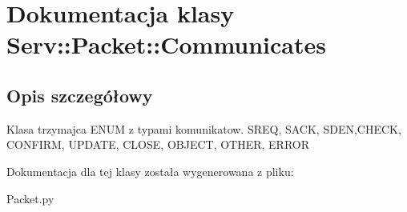 \hypertarget{class_serv_1_1_packet_1_1_communicates}{
\section{Dokumentacja klasy Serv::Packet::Communicates}
\label{class_serv_1_1_packet_1_1_communicates}
}


\subsection{Opis szczegółowy}
\begin{DoxyVerb}Klasa trzymajca ENUM z typami komunikatow.
SREQ, SACK, SDEN,CHECK, CONFIRM, UPDATE, CLOSE, OBJECT, OTHER, ERROR
\end{DoxyVerb}
 

Dokumentacja dla tej klasy została wygenerowana z pliku:\begin{DoxyCompactItemize}
\item 
Packet.py\end{DoxyCompactItemize}
